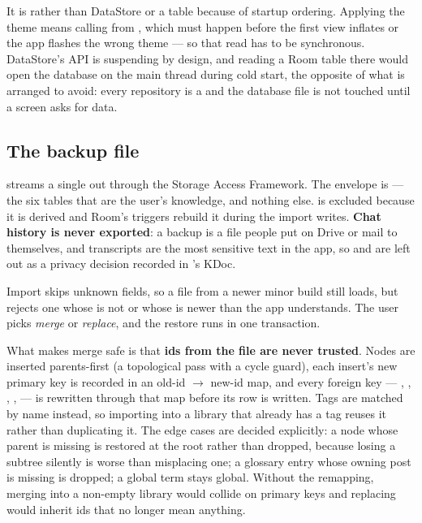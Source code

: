 It is  rather than DataStore or a table because of startup ordering. Applying
the theme means calling  from
, which must happen before the first view inflates or the app flashes the
wrong theme --- so that read has to be synchronous. DataStore's API is suspending by design, and
reading a Room table there would open the database on the main thread during cold start, the opposite
of what  is arranged to avoid: every repository is a  and the
database file is not touched until a screen asks for data.

\subsection{The backup file}

 streams a single  out through the Storage Access
Framework. The envelope is   
    
 --- the six tables that are the user's knowledge, and nothing else.
 is excluded because it is derived and Room's
triggers rebuild it during the import writes. \textbf{Chat history is never exported}: a backup is a
file people put on Drive or mail to themselves, and transcripts are the most sensitive text in the
app, so  and  are left out as a privacy decision recorded
in 's KDoc.

Import skips unknown fields, so a file from a newer minor build still loads, but rejects one whose
 is not  or whose  is newer than the app understands.
The user picks \emph{merge} or \emph{replace}, and the restore runs in one transaction.

What makes merge safe is that \textbf{ids from the file are never trusted}. Nodes are inserted
parents-first (a topological pass with a cycle guard), each insert's new primary key is recorded in an
old-id $\rightarrow$ new-id map, and every foreign key --- , ,
, ,  --- is rewritten through that map before its row is
written. Tags are matched by name instead, so importing into a library that already has a
 tag reuses it rather than duplicating it. The edge cases are decided explicitly: a
node whose parent is missing is restored at the root rather than dropped, because losing a subtree
silently is worse than misplacing one; a glossary entry whose owning post is missing is dropped; a
global term stays global. Without the remapping, merging into a non-empty library would collide on
primary keys and replacing would inherit ids that no longer mean anything.
